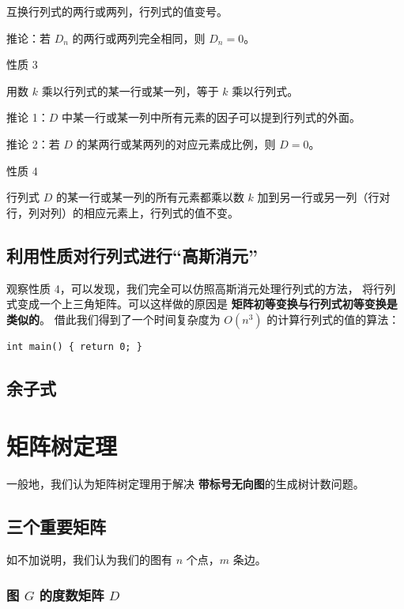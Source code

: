 \documentclass[UTF8]{article}
\begin{document}
	\qquad 互换行列式的两行或两列，行列式的值变号。
	
	\qquad 推论：若 $D_n$ 的两行或两列完全相同，则 $D_n = 0$。

	\bigskip
	
	性质 3
	
	\qquad 用数 $k$ 乘以行列式的某一行或某一列，等于 $k$ 乘以行列式。
	
	\qquad 推论 1：$D$ 中某一行或某一列中所有元素的因子可以提到行列式的外面。
	
	\qquad 推论 2：若 $D$ 的某两行或某两列的对应元素成比例，则 $D = 0$。
	
	\bigskip

	性质 4
	
	\qquad 行列式 $D$ 的某一行或某一列的所有元素都乘以数 $k$
	加到另一行或另一列（行对行，列对列）的相应元素上，行列式的值不变。

	\subsection{利用性质对行列式进行``高斯消元''}
	
	观察性质 4，可以发现，我们完全可以仿照高斯消元处理行列式的方法，
	将行列式变成一个上三角矩阵。可以这样做的原因是
	\textbf{矩阵初等变换与行列式初等变换是类似的}。
	借此我们得到了一个时间复杂度为 $O(n^3)$ 的计算行列式的值的算法：

	\lstset{language=C++}
	\begin{lstlisting}
int main() { return 0; }
	\end{lstlisting}
	
	\subsection{余子式}

	\section{矩阵树定理}
	
	一般地，我们认为矩阵树定理用于解决
	\textbf{带标号无向图}的生成树计数问题。

	\subsection{三个重要矩阵}

	如不加说明，我们认为我们的图有 $n$ 个点，$m$ 条边。

	\subsubsection{图 $G$ 的度数矩阵 $D$}
\end{document}
